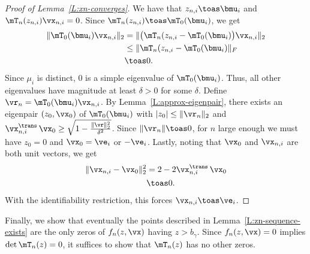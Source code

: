 \begin{proof}[Proof of Lemma~\ref{L:xn-converges}]
    We have that $z_{n,i} \toas \bmu_i$ and 
    $\mT_n(z_{n,i}) \vx_{n,i} = 0$.  Since
    $\mT_n(z_{n,i}) \toas \mT_0(\bmu_i)$, we get
    \begin{align*}
        \| \mT_0(\bmu_i) \vx_{n,i} \|_2
            &= \| \big(\mT_n(z_{n,i} - \mT_0(\bmu_i) \big) \vx_{n,i} \|_2 \\
            &\leq \| \mT_n(z_{n,i} - \mT_0(\bmu_i) \|_F \\
            &\toas 0.
    \end{align*}
    Since $\mu_i$ is distinct, $0$ is a simple eigenvalue of $\mT_0(\bmu_i)$.
    Thus, all other eigenvalues have magnitude at least $\delta > 0$ for some 
    $\delta$.
    Define $\vr_n = \mT_0(\bmu_i) \vx_{n,i}$.  By 
    Lemma~\ref{L:approx-eigenpair}, there exists an eigenpair $(z_0, \vx_0)$
    of $\mT_0(\bmu_i)$ with $| z_0 | \leq \| \vr_n \|_2$ and
    $ \vx_{n,i}^\trans \, \vx_0 \geq
        \sqrt{ 1 - \frac{\|\vr\|_2^2}{ \delta^2 } }$.  Since 
    $\|\vr_n\| \toas 0$, for $n$ large enough we must have $z_0 = 0$ and
    $\vx_0 = \ve_i$ or $-\ve_i$.  Lastly, noting that $\vx_0$ and $\vx_{n,i}$
    are both unit vectors, we get
    \begin{align*}
        \| \vx_{n,i} - \vx_0 \|_2^2
            &= 2 - 2 \vx_{n,i}^\trans \, \vx_0 \\
            &\toas 0.
    \end{align*}
    With the identifiability restriction, this forces $\vx_{n,i} \toas \ve_i$.
\end{proof}

Finally, we show that eventually the points described in Lemma~\ref{L:zn-sequence-exists} are the only zeros of $f_n(z, \vx)$ having
$z > b_\gamma$.  Since $f_n(z, \vx) = 0$ implies 
$\det \mT_n(z) = 0$, it suffices to show that $\mT_n(z)$ has no other
zeros.

